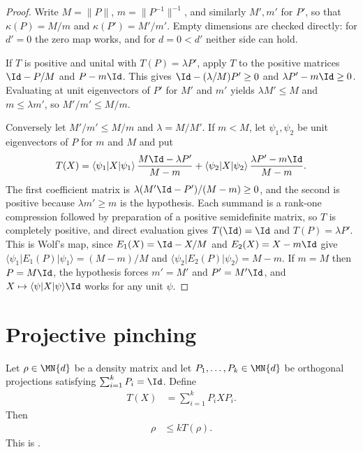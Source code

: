 \begin{proof}\leanok
    Write $M=\lVert P\rVert$, $m=\lVert P^{-1}\rVert^{-1}$, and similarly
    $M',m'$ for $P'$, so that $\kappa(P)=M/m$ and $\kappa(P')=M'/m'$.
    Empty dimensions are checked directly: for $d'=0$ the zero map works,
    and for $d=0<d'$ neither side can hold.

    If $T$ is positive and unital with $T(P)=\lambda P'$, apply $T$ to the
    positive matrices $\Id-P/M$ and $P-m\Id$. This gives
    $\Id-(\lambda/M)P'\ge0$ and $\lambda P'-m\Id\ge0$. Evaluating at unit
    eigenvectors of $P'$ for $M'$ and $m'$ yields $\lambda M'\le M$ and
    $m\le\lambda m'$, so $M'/m'\le M/m$.

    Conversely let $M'/m'\le M/m$ and $\lambda=M/M'$. If $m<M$, let
    $\psi_1,\psi_2$ be unit eigenvectors of $P$ for $m$ and $M$ and put
    \begin{align}
        T(X)=\langle\psi_1|X|\psi_1\rangle\,\frac{M\Id-\lambda P'}{M-m}
            +\langle\psi_2|X|\psi_2\rangle\,\frac{\lambda P'-m\Id}{M-m}.
    \end{align}
    The first coefficient matrix is $\lambda(M'\Id-P')/(M-m)\ge0$, and the
    second is positive because $\lambda m'\ge m$ is the hypothesis. Each
    summand is a rank-one compression followed by preparation of a positive
    semidefinite matrix, so $T$ is completely positive, and direct
    evaluation gives $T(\Id)=\Id$ and $T(P)=\lambda P'$. This is Wolf's map,
    since $E_1(X)=\Id-X/M$ and $E_2(X)=X-m\Id$ give
    $\langle\psi_1|E_1(P)|\psi_1\rangle=(M-m)/M$ and
    $\langle\psi_2|E_2(P)|\psi_2\rangle=M-m$. If $m=M$ then $P=M\Id$, the
    hypothesis forces $m'=M'$ and $P'=M'\Id$, and
    $X\mapsto\langle\psi|X|\psi\rangle\Id$ works for any unit $\psi$.
\end{proof}

\section{Projective pinching}

\begin{theorem}
    \label{thm:projective_povm_pinching}
    \leanok
    Let $\rho\in\MN{d}$ be a density matrix and let
    $P_1,\ldots,P_k\in\MN{d}$ be orthogonal projections satisfying
    $\sum_{i=1}^k P_i=\Id$.  Define
    \begin{align}
        T(X) & = \sum_{i=1}^k P_iXP_i .
    \end{align}
    Then
    \begin{align}
        \rho & \le kT(\rho).
        \label{eq:projective_pinching}
    \end{align}
    This is \cite[Chapter~8, Eq.~(8.56)]{Wolf2012Quantum}.
\end{theorem}

